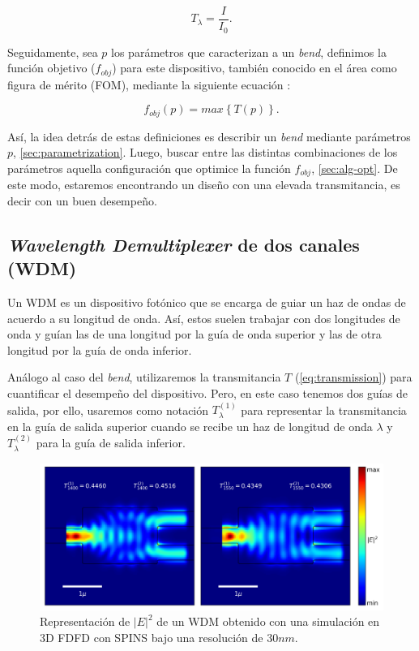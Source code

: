 \begin{equation}
  T_{\lambda} = \frac{I}{I_0}.
\label{eq:transmission}
\end{equation}

Seguidamente, sea $p$ los parámetros que caracterizan a un \emph{bend}, definimos la función objetivo ($f_{obj}$) para este dispositivo,
también conocido en el área como figura de mérito (FOM), mediante la siguiente ecuación
\citep{Su2020}:

\begin{equation}
  f_{obj}(p) = max \left \{ T(p) \right \}.
\label{eq:fom-bend}
\end{equation}

Así, la idea detrás de estas definiciones es describir un \emph{bend} mediante parámetros $p$,
\autoref{sec:parametrization}.
Luego, buscar entre las distintas combinaciones de los parámetros aquella configuración
que optimice la función $f_{obj}$, \autoref{sec:alg-opt}.
De este modo, estaremos encontrando un diseño con una elevada transmitancia, es decir con un buen desempeño.

\subsection{\emph{Wavelength Demultiplexer} de dos canales (WDM)}

Un WDM es un dispositivo fotónico que se encarga de guiar un haz de ondas de acuerdo a su longitud de onda.
Así, estos suelen trabajar con dos longitudes de onda y guían las de una longitud por la guía de onda superior
y las de otra longitud por la guía de onda inferior.

Análogo al caso del \emph{bend}, utilizaremos la transmitancia $T$ (\autoref{eq:transmission}) para cuantificar el desempeño del dispositivo.
Pero, en este caso tenemos dos guías de salida, por ello, usaremos como notación $T_{\lambda}^{(1)}$ para
representar la transmitancia en la guía de salida superior cuando se recibe un haz de longitud de onda
$\lambda$ y $T_{\lambda}^{(2)}$ para la guía de salida inferior.

\begin{figure}[ht]
  \centering
  \includegraphics[scale=0.7]{image/theory/wdm_field_dx30_px16_px12_5.png}
  \caption{Representación de $|E|^2$ de un WDM obtenido con una simulación en 3D FDFD con SPINS bajo una resolución de $30 nm$.}
  \label{fig:efield-wdm}
\end{figure}

